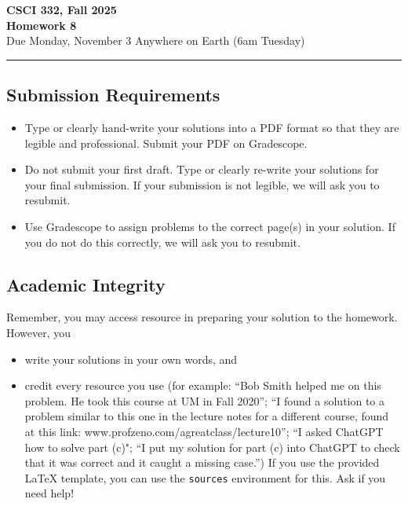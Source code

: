 \documentclass[11pt]{article}
\begin{document}
\begin{center}
\Large\textbf{CSCI 332, Fall 2025}%
\\
\LARGE\textbf{Homework 8}%
\\[0.5ex]
\large Due Monday, November 3 Anywhere on Earth (6am Tuesday)
\end{center}

\bigskip
\hrule
\bigskip

\subsection*{Submission Requirements}
\begin{itemize}
    \item Type or clearly hand-write your solutions into a PDF format so that they are legible and professional. Submit your PDF on Gradescope. 
    \item Do not submit your first draft. Type or clearly re-write your solutions for your final submission. If your submission is not legible, we will ask you to resubmit.
    \item Use Gradescope to assign problems to the correct page(s) in your solution. If you do not do this correctly, we will ask you to resubmit.
\end{itemize}

\subsection*{Academic Integrity}

Remember, you may access  resource in preparing your solution to the homework. However, you 
\begin{itemize}
    \item write your solutions in your own words, and
    \item credit every resource you use (for example: ``Bob Smith helped me on
    this problem. He took this course at UM in Fall 2020''; ``I found a solution
    to a problem similar to this one in the lecture notes for a different
    course, found at this link: www.profzeno.com/agreatclass/lecture10''; ``I
    asked ChatGPT how to solve  part (c)"; ``I put my solution for part (c) into
    ChatGPT to check that it was correct and it caught a missing case.'') If you
    use the provided LaTeX template, you can use the \texttt{sources}
    environment for this. Ask if you need help!
\end{itemize}
\end{document}
